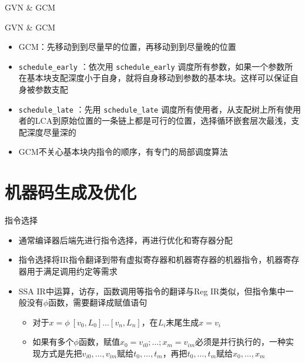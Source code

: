 \documentclass{beamer}
\begin{document}
\begin{frame}{GVN \& GCM}
\begin{minipage}{0.37\linewidth}
\begin{figure}[htpb]
  \end{figure}
\end{minipage}
\end{frame}

\begin{frame}{GVN \& GCM}
\begin{itemize}
\item GCM：先移动到到尽量早的位置，再移动到到尽量晚的位置
\item \lstinline|schedule_early| ：依次用 \lstinline|schedule_early| 调度所有参数，如果一个参数所在基本块支配深度小于自身，就将自身移动到参数的基本块。这样可以保证自身被参数支配
\item \lstinline|schedule_late| ：先用 \lstinline|schedule_late| 调度所有使用者，从支配树上所有使用者的LCA到原始位置的一条链上都是可行的位置，选择循环嵌套层次最浅，支配深度尽量深的
\item GCM不关心基本块内指令的顺序，有专门的局部调度算法
\end{itemize}

\end{frame}
\section{机器码生成及优化}

\begin{frame}{指令选择}
\begin{itemize}
  \item 通常编译器后端先进行指令选择，再进行优化和寄存器分配
  \item 指令选择将IR指令翻译到带有虚拟寄存器和机器寄存器的机器指令，机器寄存器用于满足调用约定等需求
  \item SSA IR中运算，访存，函数调用等指令的翻译与Reg IR类似，但指令集中一般没有$\phi$函数，需要翻译成赋值语句
  \begin{itemize}
    \item 对于$x = \phi\ [v_0, L_0] \ldots [v_n, L_n]$，在$L_i$末尾生成$x = v_i$
    \item 如果有多个$\phi$函数，赋值$x_0 = v_{i0}; \ldots; x_m = v_{im}$必须是并行执行的，一种实现方式是先把$v_{i0}, \ldots, v_{im}$赋给$t_0, \ldots, t_m$，再把$t_0, \ldots, t_m$赋给$x_0, \ldots, x_m$
  \end{itemize}
\end{itemize}
\end{frame}
\end{document}
